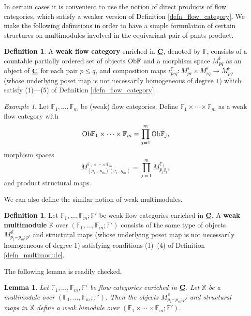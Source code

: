 \documentclass[reqno, 10pt]{amsart}
\numberwithin{equation}{section}
\numberwithin{equation}{section}
\newtheorem{lemma}[thm]{Lemma}
\theoremstyle{definition}
\newtheorem{defn}[thm]{Definition}
\theoremstyle{remark}
\newtheorem{example}[thm]{Example}
\newcommand{\beqn}{\begin{equation*}}
\newcommand{\eeqn}{\end{equation*}}
\newcommand{\mb}{\mathbb}
\newcommand{\uds}[1]{\underline{\smash{#1}}}
\begin{document}
In certain cases it is convenient to use the notion of direct products of flow categories, which satisfy a weaker version of Definition \ref{defn_flow_category}. We make the following definitions in order to have a simple formulation of certain structures on multimodules involved in the equivariant pair-of-pants product. 

\begin{defn}\label{defn_weak_flow_category}
A {\bf weak flow category} enriched in $\uds{\bf C}$, denoted by ${\mb F}$, consists of a countable partially ordered set of objects ${\rm Ob}{\mb F}$ and a morphism space $M_{pq}^{\mb F}$ as an object of $\uds{\bf C}$ for each pair $p \leq q$, and composition maps $\iota_{prq}^{\mb F}: M_{pr}^{\mb F}\times M_{rq}^{\mb F} \to M_{pq}^{\mb F}$ (whose underlying poset map is not necessarily homogeneous of degree $1$) which satisfy (1)---(5) of Definition \ref{defn_flow_category}.
\end{defn}

\begin{example}
Let ${\mb F}_1, \ldots, {\mb F}_m$ be (weak) flow categories. Define ${\mb F}_1\times \cdots \times {\mb F}_m$ as a weak flow category with 
\beqn
{\rm Ob} {\mb F}_1\times \cdots \times {\mb F}_m = \prod_{j=1}^m {\rm Ob}{\mb F}_j,
\eeqn
morphism spaces
\beqn
M_{(p_1 \cdots p_m)(q_1 \cdots q_m)}^{{\mb F}_1\times \cdots \times {\mb F}_m} = \prod_{j=1}^m M_{p_j q_j}^{{\mb F}_j},
\eeqn
and product structural maps. 
\end{example}

We can also define the similar notion of weak multimodules. 

\begin{defn}\label{defn_weak_multimodule}
Let ${\mb F}_1, \ldots, {\mb F}_m; {\mb F}'$ be weak flow categories enriched in $\uds{\bf C}$. A {\bf weak multimodule} ${\mb X}$ over $({\mb F}_1, \ldots, {\mb F}_m; {\mb F}')$ consists of the same type of objects $M_{p_1 \cdots p_m; p'}^{\mb X}$ and structural maps (whose underlying poset map is not necessarily homogeneous of degree $1$) satisfying conditions (1)--(4) of Definition \ref{defn_multimodule}. 
\end{defn}

The following lemma is readily checked.

\begin{lemma}\label{lemma_multimodule_weak_bimodule}
Let ${\mb F}_1, \ldots, {\mb F}_m, {\mb F}'$ be flow categories enriched in $\uds{\bf C}$. Let ${\mb X}$ be a multimodule over $({\mb F}_1, \ldots, {\mb F}_m; {\mb F}')$. Then the objects $M_{p_1 \cdots p_m; p'}^{\mb X}$ and structural maps in ${\mb X}$ define a weak bimodule over $({\mb F}_1 \times \cdots \times {\mb F}_m; {\mb F}')$. 
\end{lemma}
\end{document}
